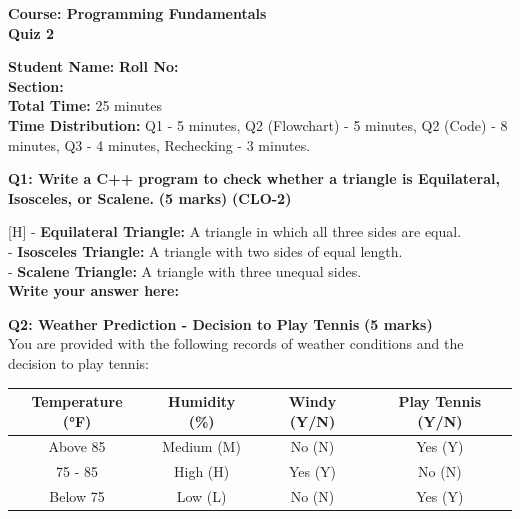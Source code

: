 \documentclass[a4paper,12pt]{article}
\newcommand{\studentinfo}{
    \textbf{Student Name:} \underline{\hspace{4cm}} \hspace{0.5cm}
    \textbf{Roll No:} \underline{\hspace{3cm}} \hspace{0.5cm} \\
    \textbf{Section:} \underline{\hspace{2cm}} \\
}
\begin{document}
\begin{center}
    {\large \textbf{Course: Programming Fundamentals}} \\
    \vspace{0.2cm}
    {\Large \textbf{Quiz 2}} \\
\end{center}

\vspace{0.5cm}

\studentinfo

\vspace{0.5cm}
\textbf{Total Time:} 25 minutes \\
\textbf{Time Distribution:} Q1 - 5 minutes, Q2 (Flowchart) - 5 minutes, Q2 (Code) - 8 minutes, Q3 - 4 minutes, Rechecking - 3 minutes.
\vspace{0.5cm}

\textbf{Q1: Write a C++ program to check whether a triangle is Equilateral, Isosceles, or Scalene.} \hfill \textbf{(5 marks)}  \textbf{(CLO-2)}

\vspace{0.5cm}[H]
- \textbf{Equilateral Triangle:} A triangle in which all three sides are equal. \\
- \textbf{Isosceles Triangle:} A triangle with two sides of equal length. \\
- \textbf{Scalene Triangle:} A triangle with three unequal sides. \\

\vspace{0.5cm}
\textbf{Write your answer here:}
\begin{tcolorbox}[colframe=black, colback=white, width=\textwidth, height=12cm, valign=center]
\end{tcolorbox}

\vspace{0.5cm}

\textbf{Q2: Weather Prediction - Decision to Play Tennis} \hfill \textbf{(5 marks)} \\
You are provided with the following records of weather conditions and the decision to play tennis:

\begin{center}
\begin{tabular}{|c|c|c|c|}
\hline
\textbf{Temperature (°F)} & \textbf{Humidity (\%)} & \textbf{Windy (Y/N)} & \textbf{Play Tennis (Y/N)} \\
\hline
Above 85 & Medium (M) & No (N) & Yes (Y) \\
75 - 85 & High (H) & Yes (Y) & No (N) \\
Below 75 & Low (L) & No (N) & Yes (Y) \\
\hline
\end{tabular}
\end{center}
\end{document}
